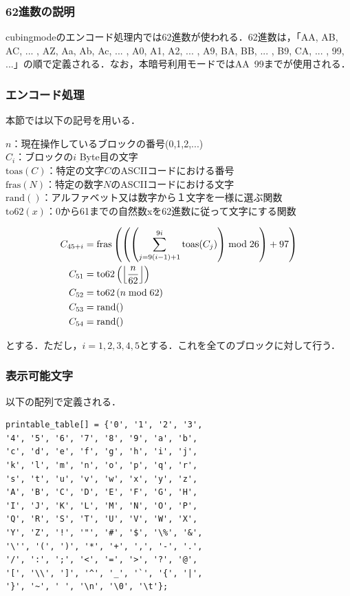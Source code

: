 \documentclass[a4p]{jarticle}
\begin{document}
\subsubsection{62進数の説明}
cubingmodeのエンコード処理内では62進数が使われる．62進数は，「AA, AB, AC, ... , AZ, Aa, Ab, Ac, ... , A0, A1, A2, ... , A9, BA, BB, ... , B9, CA, ... , 99, ...」の順で定義される．なお，本暗号利用モードではAA~99までが使用される．

\subsubsection{エンコード処理}
本節では以下の記号を用いる．

\(n\)：現在操作しているブロックの番号(0,1,2,...)\\
\(C_i\)：ブロックの\(i\) Byte目の文字\\
\(\mathrm{toas}(C)\)：特定の文字\(C\)のASCIIコードにおける番号\\
\(\mathrm{fras}(N)\)：特定の数字\(N\)のASCIIコードにおける文字\\
\(\mathrm{rand}()\)：アルファベット又は数字から１文字を一様に選ぶ関数\\
\(\mathrm{to62}(x)\)：0から61までの自然数xを62進数に従って文字にする関数

\footnotesize
\begin{align}
C_{45+i} &= \mathrm{fras}\left(\left(\left(\sum_{j=9(i-1)+1}^{9i}{\mathrm{toas}(C_j)}\right)\bmod 26\right)+97\right) \notag\\
C_{51} &= \mathrm{to62}\left (\left \lfloor\frac{n}{62}\right \rfloor \right) \notag\\
C_{52} &= \mathrm{to62}\left ( n \bmod 62 \right) \notag\\
C_{53} &= \mathrm{rand}() \notag\\
C_{54} &= \mathrm{rand}() \notag\\
\end{align}
\normalsize

とする．ただし，\(i=1,2,3,4,5\)とする．これを全てのブロックに対して行う．

\subsubsection{表示可能文字}
以下の配列で定義される．
\begin{verbatim}
printable_table[] = {'0', '1', '2', '3', 
'4', '5', '6', '7', '8', '9', 'a', 'b', 
'c', 'd', 'e', 'f', 'g', 'h', 'i', 'j', 
'k', 'l', 'm', 'n', 'o', 'p', 'q', 'r', 
's', 't', 'u', 'v', 'w', 'x', 'y', 'z', 
'A', 'B', 'C', 'D', 'E', 'F', 'G', 'H', 
'I', 'J', 'K', 'L', 'M', 'N', 'O', 'P',
'Q', 'R', 'S', 'T', 'U', 'V', 'W', 'X', 
'Y', 'Z', '!', '"', '#', '$', '\%', '&', 
'\'', '(', ')', '*', '+', ',', '-', '.', 
'/', ':', ';', '<', '=', '>', '?', '@', 
'[', '\\', ']', '^', '_', '`', '{', '|', 
'}', '~', ' ', '\n', '\0', '\t'};
\end{verbatim}
\end{document}
